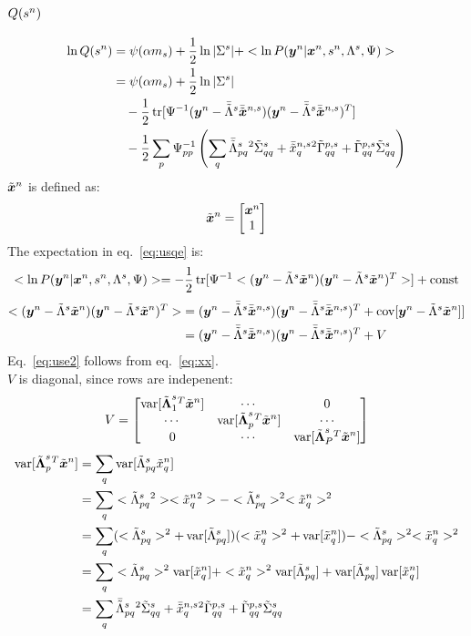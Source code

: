 \documentclass[a4paper]{article}
\begin{document}
\subsection{$Q(\Xs)$}
\begin{align}
  \ln Q(\Xs)
  &=\psi(\alpha m_s)+\frac{1}{2}\ln |\Xxv|+<\ln P(\Xy|\Xx,\Xs,\Xl,\Psi)> \label{eq:usqe} \\
  &=\psi(\alpha m_s)+\frac{1}{2}\ln |\Xxv| \nonumber \\
  &\quad-\frac{1}{2}\Xtr[\Xpsii(\Xy-\Xltm\Xxtm)(\Xy-\Xltm\Xxtm)^T] \nonumber \\
  &\quad-\frac{1}{2}\sum_p\Xpsii_{pp}\left(\sum_q\Xltmpq{}^2\Xxtv_{qq}+\Xxtmq{}^2\Xltvp_{qq}+\Xltvp_{qq}\Xxtv_{qq}\right)
\end{align}
$\Xxt$ is defined as:
\begin{align}
  \Xxt=
  \begin{bmatrix}
    \Xx \\
    1
  \end{bmatrix}
\end{align}
The expectation in eq.~\ref{eq:usqe} is:
\begin{align}
  <\ln P(\Xy|\Xx,\Xs,\Xl,\Psi)>=-\frac{1}{2}\Xtr[\Xpsii<(\Xy-\Xlt\Xxt)(\Xy-\Xlt\Xxt)^T>]+\text{const} \label{eq:usle}
\end{align}
\begin{align}
  <(\Xy-\Xlt\Xxt)(\Xy-\Xlt\Xxt)^T>
  &=(\Xy-\Xltm\Xxtm)(\Xy-\Xltm\Xxtm)^T+\Xcov[\Xy-\Xlt\Xxt]] \label{eq:use2} \\
  &=(\Xy-\Xltm\Xxtm)(\Xy-\Xltm\Xxtm)^T+V \label{eq:use}
\end{align}
Eq.~\ref{eq:use2} follows from eq.~\ref{eq:xx}. \\
$V$ is diagonal, since rows are indepenent:
\begin{align}
  V=
  \begin{bmatrix}
    \Xvar[\Xltb_1{}^T\Xxt] & \cdots & 0 \\
    \cdots & \Xvar[\Xltb_p{}^T\Xxt] & \cdots \\
    0   & \cdots & \Xvar[\Xltb_P{}^T\Xxt]
  \end{bmatrix}
\end{align}
\begin{align}
  \Xvar[\Xltp{}^T\Xxt]
  &=\sum_q\Xvar[\Xltpq\Xxtq] \\
  &=\sum_q<\Xltpq{}^2><\Xxtq{}^2>-<\Xltpq>^2<\Xxtq>^2 \label{eq:usv1} \\
  &=\sum_q(<\Xltpq>^2+\Xvar[\Xltpq])(<\Xxtq>^2+\Xvar[\Xxtq])-<\Xltpq>^2<\Xxtq>^2 \label{eq:usv2} \\
  &=\sum_q<\Xltpq>^2\Xvar[\Xxtq]+<\Xxtq>^2\Xvar[\Xltpq]+\Xvar[\Xltpq]\Xvar[\Xxtq] \\
  &=\sum_q\Xltmpq{}^2\Xxtv_{qq}+\Xxtmq{}^2\Xltvp_{qq}+\Xltvp_{qq}\Xxtv_{qq}
\end{align}
\end{document}
